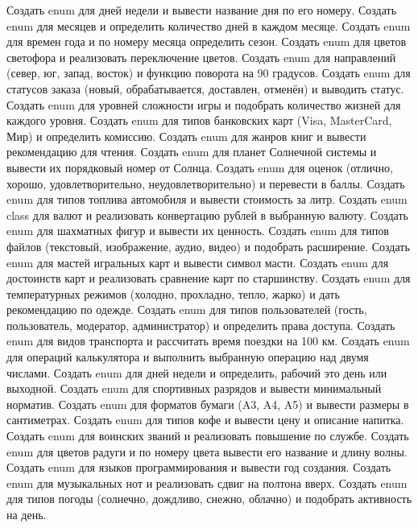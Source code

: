 Создать enum для дней недели и вывести название дня по его номеру.
Создать enum для месяцев и определить количество дней в каждом месяце.
Создать enum для времен года и по номеру месяца определить сезон.
Создать enum для цветов светофора и реализовать переключение цветов.
Создать enum для направлений (север, юг, запад, восток) и функцию поворота на 90 градусов.
Создать enum для статусов заказа (новый, обрабатывается, доставлен, отменён) и выводить статус.
Создать enum для уровней сложности игры и подобрать количество жизней для каждого уровня.
Создать enum для типов банковских карт (Visa, MasterCard, Мир) и определить комиссию.
Создать enum для жанров книг и вывести рекомендацию для чтения.
Создать enum для планет Солнечной системы и вывести их порядковый номер от Солнца.
Создать enum для оценок (отлично, хорошо, удовлетворительно, неудовлетворительно) и перевести в баллы.
Создать enum для типов топлива автомобиля и вывести стоимость за литр.
Создать enum class для валют и реализовать конвертацию рублей в выбранную валюту.
Создать enum для шахматных фигур и вывести их ценность.
Создать enum для типов файлов (текстовый, изображение, аудио, видео) и подобрать расширение.
Создать enum для мастей игральных карт и вывести символ масти.
Создать enum для достоинств карт и реализовать сравнение карт по старшинству.
Создать enum для температурных режимов (холодно, прохладно, тепло, жарко) и дать рекомендацию по одежде.
Создать enum для типов пользователей (гость, пользователь, модератор, администратор) и определить права доступа.
Создать enum для видов транспорта и рассчитать время поездки на 100 км.
Создать enum для операций калькулятора и выполнить выбранную операцию над двумя числами.
Создать enum для дней недели и определить, рабочий это день или выходной.
Создать enum для спортивных разрядов и вывести минимальный норматив.
Создать enum для форматов бумаги (A3, A4, A5) и вывести размеры в сантиметрах.
Создать enum для типов кофе и вывести цену и описание напитка.
Создать enum для воинских званий и реализовать повышение по службе.
Создать enum для цветов радуги и по номеру цвета вывести его название и длину волны.
Создать enum для языков программирования и вывести год создания.
Создать enum для музыкальных нот и реализовать сдвиг на полтона вверх.
Создать enum для типов погоды (солнечно, дождливо, снежно, облачно) и подобрать активность на день.
